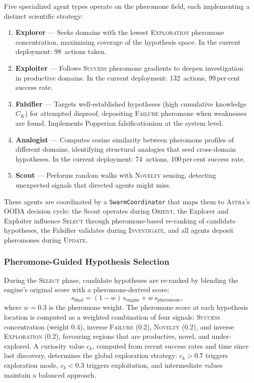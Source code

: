 \documentclass[usenatbib]{rasti}
\newcommand{\astra}{\textsc{Astra}\xspace}
\begin{document}
Five specialized agent types operate on the pheromone field, each implementing a distinct scientific strategy:
\begin{enumerate}
  \item \textbf{Explorer} --- Seeks domains with the lowest \textsc{Exploration} pheromone concentration, maximizing coverage of the hypothesis space. In the current deployment: 98~actions taken.
  \item \textbf{Exploiter} --- Follows \textsc{Success} pheromone gradients to deepen investigation in productive domains. In the current deployment: 132~actions, 99\,per\,cent success rate.
  \item \textbf{Falsifier} --- Targets well-established hypotheses (high cumulative knowledge $C_K$) for attempted disproof, depositing \textsc{Failure} pheromone when weaknesses are found. Implements Popperian falsificationism at the system level.
  \item \textbf{Analogist} --- Computes cosine similarity between pheromone profiles of different domains, identifying structural analogies that seed cross-domain hypotheses. In the current deployment: 74~actions, 100\,per\,cent success rate.
  \item \textbf{Scout} --- Performs random walks with \textsc{Novelty} sensing, detecting unexpected signals that directed agents might miss.
\end{enumerate}
These agents are coordinated by a \texttt{SwarmCoordinator} that maps them to \astra's OODA decision cycle: the Scout operates during \textsc{Orient}, the Explorer and Exploiter influence \textsc{Select} through pheromone-based re-ranking of candidate hypotheses, the Falsifier validates during \textsc{Investigate}, and all agents deposit pheromones during \textsc{Update}.

\subsubsection{Pheromone-Guided Hypothesis Selection}

During the \textsc{Select} phase, candidate hypotheses are re-ranked by blending the engine's original score with a pheromone-derived score:
\begin{equation}
  s_{\mathrm{final}} = (1 - w)\,s_{\mathrm{engine}} + w\,s_{\mathrm{pheromone}},
  \label{eq:ranking}
\end{equation}
where $w = 0.3$ is the pheromone weight.
The pheromone score at each hypothesis location is computed as a weighted combination of four signals: \textsc{Success} concentration (weight 0.4), inverse \textsc{Failure} (0.2), \textsc{Novelty} (0.2), and inverse \textsc{Exploration} (0.2), favouring regions that are productive, novel, and under-explored.
A curiosity value $c_k$, computed from recent success rates and time since last discovery, determines the global exploration strategy: $c_k > 0.7$ triggers exploration mode, $c_k < 0.3$ triggers exploitation, and intermediate values maintain a balanced approach.
\end{document}
